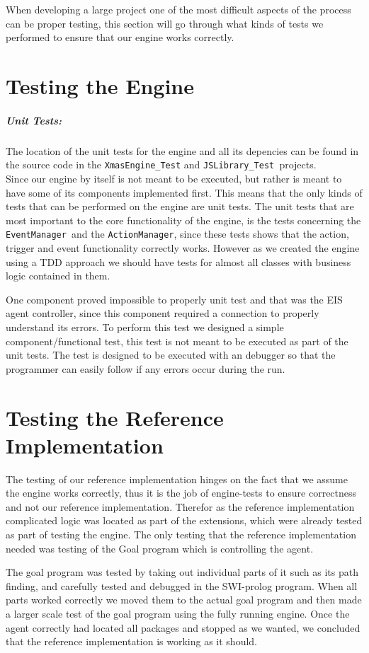When developing a large project one of the most difficult aspects
of the process can be proper testing, this section will go through
what kinds of tests we performed to ensure that our engine works correctly.


\section{Testing the Engine}


\subparagraph*{Unit Tests: }

The location of the unit tests for the engine and all its depencies
can be found in the source code in the \texttt{XmasEngine\_Test} and
\texttt{JSLibrary\_Test }projects.\\


Since our engine by itself is not meant to be executed, but rather
is meant to have some of its components implemented first. This means
that the only kinds of tests that can be performed on the engine are
unit tests. The unit tests that are most important to the core functionality
of the engine, is the tests concerning the \texttt{EventManager }and
the \texttt{ActionManager}, since these tests shows that the action,
trigger and event functionality correctly works. However as we created
the engine using a TDD approach we should have tests for almost all
classes with business logic contained in them. 

One component proved impossible to properly unit test and that was
the EIS agent controller, since this component required a connection
to properly understand its errors. To perform this test we designed
a simple component/functional test, this test is not meant to be executed
as part of the unit tests. The test is designed to be executed with
an debugger so that the programmer can easily follow if any errors
occur during the run.


\section{Testing the Reference Implementation}

The testing of our reference implementation hinges on the fact that
we assume the engine works correctly, thus it is the job of engine-tests
to ensure correctness and not our reference implementation. Therefor
as the reference implementation complicated logic was located as part
of the extensions, which were already tested as part of testing the
engine. The only testing that the reference implementation needed
was testing of the Goal program which is controlling the agent.

The goal program was tested by taking out individual parts of it such
as its path finding, and carefully tested and debugged in the SWI-prolog
program. When all parts worked correctly we moved them to the actual
goal program and then made a larger scale test of the goal program
using the fully running engine. Once the agent correctly had located
all packages and stopped as we wanted, we concluded that the reference
implementation is working as it should.

